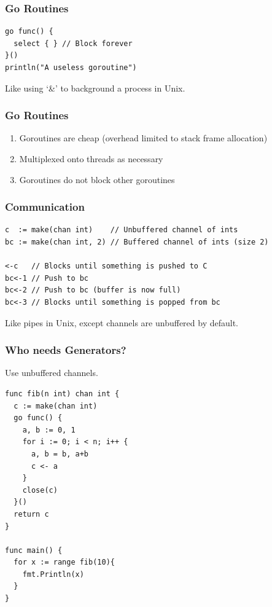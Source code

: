 \documentclass[xelatex,aspectratio=169]{beamer}
\begin{document}
\begin{frame}[fragile]
	\frametitle{Go Routines}
\begin{verbatim}
go func() {
  select { } // Block forever
}()
println("A useless goroutine")
\end{verbatim}
\begin{flushleft}
	Like using `\&' to background a process in Unix.
\end{flushleft}
\end{frame}

\begin{frame}
	\frametitle{Go Routines}
	\begin{enumerate}
		\item<1> Goroutines are cheap (overhead limited to stack frame allocation)
		\item<2> Multiplexed onto threads as necessary
		\item<3> Goroutines do not block other goroutines
	\end{enumerate}
\end{frame}

\begin{frame}[fragile]
	\frametitle{Communication}
\begin{verbatim}
c  := make(chan int)    // Unbuffered channel of ints
bc := make(chan int, 2) // Buffered channel of ints (size 2)

<-c   // Blocks until something is pushed to C
bc<-1 // Push to bc
bc<-2 // Push to bc (buffer is now full)
bc<-3 // Blocks until something is popped from bc
\end{verbatim}
\begin{flushleft}
	Like pipes in Unix, except channels are unbuffered by default.
\end{flushleft}
\end{frame}

\begin{frame}[fragile]
	\frametitle{Who needs Generators?}
	Use unbuffered channels.
\tiny
\begin{verbatim}
func fib(n int) chan int {
  c := make(chan int)
  go func() {
    a, b := 0, 1
    for i := 0; i < n; i++ {
      a, b = b, a+b
      c <- a
    }
    close(c)
  }()
  return c
}

func main() {
  for x := range fib(10){
    fmt.Println(x)
  }
}
\end{verbatim}
\end{frame}
\end{document}
